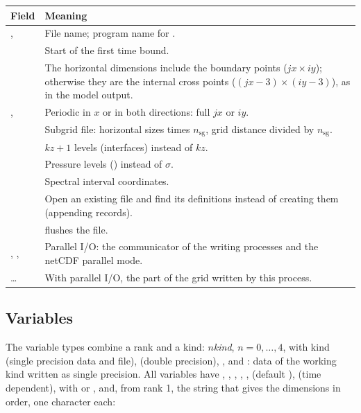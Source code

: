 \begin{longtable}{L{3.2cm} L{10.8cm}}
  \toprule
  \textbf{Field} & \textbf{Meaning} \\
  \midrule
  \endhead
  \bottomrule
  \endfoot
  ,  & File name; program name for . \\
   & Start of the first time bound. \\
   & The horizontal dimensions include the boundary points
    ($jx \times iy$); otherwise they are the internal cross points
    ($(jx-3) \times (iy-3)$), as in the model output. \\
  ,  & Periodic in $x$ or in both directions:
    full $jx$ or $iy$. \\
   & Subgrid file: horizontal sizes times $n_\text{sg}$,
    grid distance divided by $n_\text{sg}$. \\
   & $kz+1$ levels (interfaces) instead of $kz$. \\
   & Pressure levels () instead of $\sigma$. \\
   & Spectral interval coordinates. \\
   & Open an existing file and find its definitions instead
    of creating them (appending records). \\
   &  flushes the file. \\
  , ,  & Parallel I/O: the
    communicator of the writing processes and the netCDF parallel mode. \\
   \ldots\  & With parallel I/O,
    the part of the grid written by this process. \\
\end{longtable}

\subsection{Variables}

The variable types combine a rank and a kind:
$n$\textit{kind}, $n = 0, \ldots, 4$, with kind
 (single precision data and file),  (double
precision), , and : data of the working kind
 written as single precision. All variables have ,
, , , ,
 (default ),  (time
dependent),  with  or , and,
from rank 1, the string  that gives the dimensions in order, one
character each:

